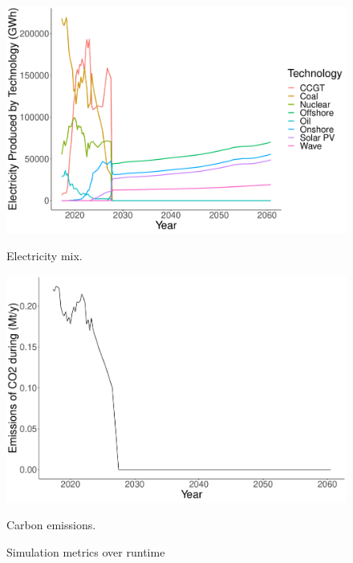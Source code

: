 \documentclass{article}
\begin{document}
\begin{figure}
\centering
\begin{minipage}{.5\textwidth}
  \centering
  \includegraphics[width=\linewidth]{figures/electricity_generated_plot.pdf}
  \caption{Electricity mix.}
  \label{fig:electricity_generated_plot}
\end{minipage}%
\begin{minipage}{.5\textwidth}
  \centering
  \includegraphics[width=\linewidth]{figures/emissions_plot.pdf}
  \caption{Carbon emissions.}
  \label{fig:emissions_plot}
\end{minipage}
\caption{Simulation metrics over runtime}
\end{figure}
\end{document}

